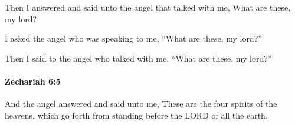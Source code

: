 			\begin{versebox}
					\item[BHS] 
					\item[LXX] 
					\item[ASV] Then I answered and said unto the angel that talked with me, What are these, my lord?
					\item[NIV] I asked the angel who was speaking to me, “What are these, my lord?”
					\item[NRSV] Then I said to the angel who talked with me, “What are these, my lord?”
			\end{versebox}

		\paragraph{Zechariah 6:5} %
			\label{ZECHARIAH-6-5}

			And the angel answered and said unto me, These are the four spirits of the heavens, which go forth from standing before the LORD of all the earth.

